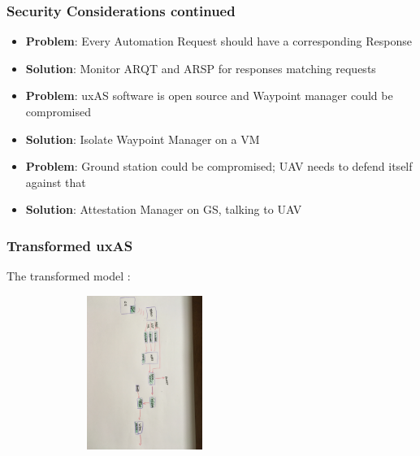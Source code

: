 \documentclass{beamer}
\begin{document}
\begin{frame}\frametitle{Security Considerations continued}

\begin{itemize}[<+->]
\item \textbf{Problem}: Every Automation Request should have a corresponding Response
\item \textbf{Solution}: Monitor ARQT and ARSP for responses matching requests

\item \textbf{Problem}: uxAS software is open source and Waypoint manager could be compromised
\item \textbf{Solution}: Isolate Waypoint Manager on a VM

\item \textbf{Problem}: Ground station could be compromised; UAV needs to defend itself against that
\item \textbf{Solution}: Attestation Manager on GS, talking to UAV
\end{itemize}

\end{frame}


\begin{frame}\frametitle{Transformed uxAS}

The transformed model :

\includegraphics[width=90mm,height=50mm]{final-arch.jpg}

\end{frame}
\end{document}

